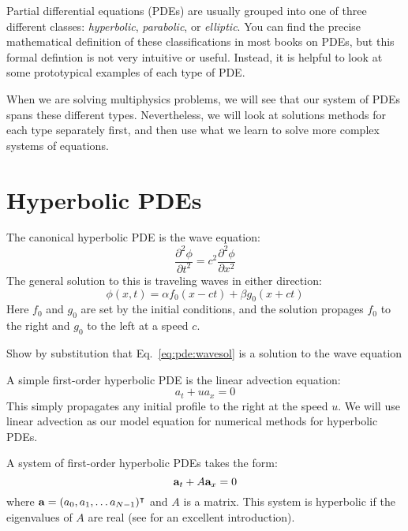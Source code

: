 Partial differential equations (PDEs) are usually grouped into one of
three different classes: {\em hyperbolic}, {\em parabolic}, or {\em
  elliptic}.  You can find the precise mathematical definition of
these classifications in most books on PDEs, but this formal defintion
is not very intuitive or useful.  Instead, it is helpful to look at
some prototypical examples of each type of PDE.

When we are solving multiphysics problems, we will see that our 
system of PDEs spans these different types.  Nevertheless, we will
look at solutions methods for each type separately first, and then
use what we learn to solve more complex systems of equations.

\section{Hyperbolic PDEs}

The canonical hyperbolic PDE is the wave equation:
\begin{equation}
  \frac{\partial^2 \phi}{\partial t^2} = c^2 \frac{\partial^2 \phi}{\partial x^2}
\end{equation}   
The general solution to this is traveling waves in either direction:
\begin{equation}
\label{eq:pde:wavesol}
  \phi(x,t) = \alpha f_0(x - ct) + \beta g_0(x + ct)
\end{equation}
Here $f_0$ and $g_0$ are set by the initial
conditions, and the solution propages $f_0$ to the right and $g_0$ to
the left at a speed $c$.

\begin{exercise}
{Show by substitution that Eq.~\ref{eq:pde:wavesol} is a solution
to the wave equation}
\end{exercise}

A simple first-order hyperbolic PDE is the linear advection equation:
\begin{equation}
a_t + u a_x = 0
\end{equation}
This simply propagates any initial profile to the right at the speed
$u$.  We will use linear advection as our model equation for numerical
methods for hyperbolic PDEs.

A system of first-order hyperbolic PDEs takes the form:
\begin{equation}
{\bf a}_t + A {\bf a}_x = 0
\end{equation}
where ${\bf a} = (a_0, a_1, \ldots a_{N-1})^\intercal$ and $A$ is a matrix.
This system is hyperbolic if the eigenvalues of $A$ are real (see
\cite{leveque:2002} for an excellent introduction).

